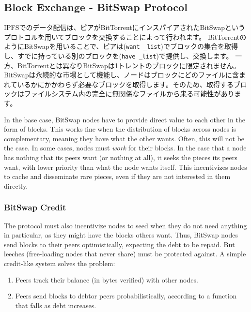 \documentclass{sig-alternate}
\begin{document}
\subsection{Block Exchange - BitSwap Protocol}

IPFSでのデータ配信は、ピアがBitTorrentにインスパイアされたBitSwapというプロトコルを用いてブロックを交換することによって行われます。
BitTorrentのようにBitSwapを用いることで、ピアは(\texttt {want \_list})でブロックの集合を取得し、すでに持っている別のブロックを(\texttt {have \_list})で提供し、交換します。
一方、BitTorrentとは異なりBitSwapは1トレントのブロックに限定されません。
BitSwapは永続的な市場として機能し、ノードはブロックにどのファイルに含まれているかにかかわらず必要なブロックを取得します。そのため、取得するブロックはファイルシステム内の完全に無関係なファイルから来る可能性があります。

In the base case, BitSwap nodes have to provide direct value to each other
in the form of blocks. This works fine when the distribution of blocks across
nodes is complementary, meaning they have what the other wants. Often, this
will not be the case. In some cases, nodes must \textit{work} for their
blocks. In the case that a node has nothing that its peers want (or
nothing at all), it seeks the pieces its peers want, with lower
priority than what the node wants itself. This incentivizes nodes to cache and
disseminate rare pieces, even if they are not interested in them directly.


\subsubsection{BitSwap Credit}

The protocol must also incentivize nodes to seed when they do not need
anything in particular, as they might have the blocks others want. Thus,
BitSwap nodes send blocks to their peers optimistically, expecting the debt to
be repaid. But leeches (free-loading nodes that never share) must be protected against. A simple credit-like system solves the problem:

\begin{enumerate}
  \item Peers track their balance (in bytes verified) with other nodes.
  \item Peers send blocks to debtor peers probabilistically, according to
        a function that falls as debt increases.
\end{enumerate}
\end{document}
